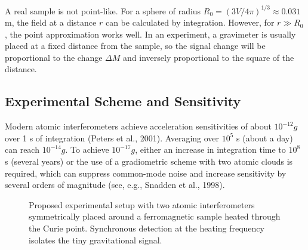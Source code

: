 \documentclass[12pt]{article}
\theoremstyle{remark}
\begin{document}
	A real sample is not point-like. For a sphere of radius $R_0 = (3V/4\pi)^{1/3} \approx 0.031$ m, the field at a distance $r$ can be calculated by integration. However, for $r \gg R_0$, the point approximation works well. In an experiment, a gravimeter is usually placed at a fixed distance from the sample, so the signal change will be proportional to the change $\Delta M$ and inversely proportional to the square of the distance.
	
	\subsection{Experimental Scheme and Sensitivity}
	\label{subsec:lab-scheme}
	
	Modern atomic interferometers achieve acceleration sensitivities of about $10^{-12}g$ over 1 s of integration (Peters et al., 2001). Averaging over $10^5$ s (about a day) can reach $10^{-14}g$. To achieve $10^{-17}g$, either an increase in integration time to $10^8$ s (several years) or the use of a gradiometric scheme with two atomic clouds is required, which can suppress common-mode noise and increase sensitivity by several orders of magnitude (see, e.g., Snadden et al., 1998). 
	
	\begin{figure}[htbp]
		\centering
		\caption{Proposed experimental setup with two atomic interferometers symmetrically placed around a ferromagnetic sample heated through the Curie point. Synchronous detection at the heating frequency isolates the tiny gravitational signal.}
		\label{fig:lab-setup}
	\end{figure}
	
\end{document}
